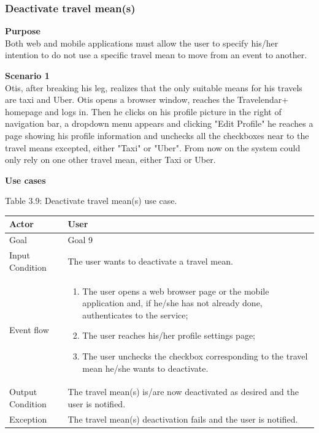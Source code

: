 \documentclass{article}
\begin{document}
	\subsubsection{Deactivate travel mean(s)}
	
	\bigskip
	\noindent
	\textbf{Purpose} \\
	Both web and mobile applications must allow the user to specify his/her intention to do not use a specific travel mean to move from an event to another.
	
	\bigskip
	\noindent
	\textbf{Scenario 1} \\
	Otis, after breaking his leg, realizes that the only suitable means for his travels are taxi and Uber. Otis opens a browser window, reaches the Travelendar+ homepage and logs in. Then he clicks on his profile picture in the right of navigation bar, a dropdown menu appears and clicking "Edit Profile" he reaches a page showing his profile information and unchecks all the checkboxes near to the travel means excepted, either "Taxi" or "Uber". From now on the system could only rely on one other travel mean, either Taxi or Uber.
	
	\bigskip
	\noindent
	\textbf{Use cases} \\
	
	\begin{center}
		Table 3.9: Deactivate travel mean(s) use case.
		
		\bigskip
    		\begin{tabular}{p{}|p{}}
   		 	\hline
    			Actor & User \\ \hline
    			Goal & Goal 9 \\ \hline
    			Input Condition & The user wants to deactivate a travel mean. \\ \hline
    			Event flow & 
			\begin{enumerate}
  				\item The user opens a web browser page or the mobile application and, if he/she has not already done, authenticates to the service;
  				\item The user reaches his/her profile settings page;
  				\item The user unchecks the checkbox corresponding to the travel mean he/she wants to deactivate.
 			 \end{enumerate} \\ \hline
    			Output Condition & The travel mean(s) is/are now deactivated as desired and the user is notified. \\ \hline
    			Exception & The travel mean(s) deactivation fails and the user is notified. \\ \hline
    		\end{tabular}
	\end{center}
	
\end{document}
